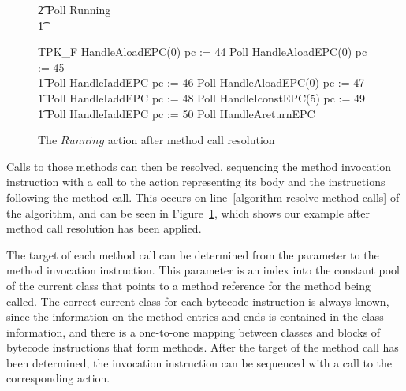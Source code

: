 \begin{figure}[t]
\begin{circus}
    \t2 \circfi \circseq Poll \circseq Running \\
    \t1 \circfi
  \end{circus}
  \begin{circus}
    TPK\_F \circdef HandleAloadEPC(0) \circseq pc := 44 \circseq Poll \circseq HandleAloadEPC(0) \circseq pc := 45 \circseq \\
    \t1 Poll \circseq HandleIaddEPC \circseq pc := 46 \circseq Poll \circseq HandleAloadEPC(0) \circseq pc := 47 \circseq \\
    \t1 Poll \circseq HandleIaddEPC \circseq pc := 48 \circseq Poll \circseq HandleIconstEPC(5) \circseq pc := 49 \circseq \\
    \t1 Poll \circseq HandleIaddEPC \circseq pc := 50 \circseq Poll \circseq HandleAreturnEPC
  \end{circus}
  \caption{The $Running$ action after method call resolution}
  \label{method-call-resolution-example-figure}
\end{figure}

Calls to those methods can then be resolved, sequencing the method
invocation instruction with a call to the \Circus{} action representing its body and the
instructions following the method call. 
This occurs on line~\ref{algorithm-resolve-method-calls} of the
algorithm, and can be seen in
Figure~\ref{method-call-resolution-example-figure}, which shows our
example after method call resolution has been applied.

The target of each method call can be determined from the parameter to
the method invocation instruction.
This parameter is an index into the constant pool of the current class
that points to a method reference for the method being called.
The correct current class for each bytecode instruction is always
known, since the information on the method entries and ends is
contained in the class information, and there is a one-to-one mapping
between classes and blocks of bytecode instructions that form methods.
After the target of the method call has been determined, the
invocation instruction can be sequenced with a call to the
corresponding \Circus{} action.

